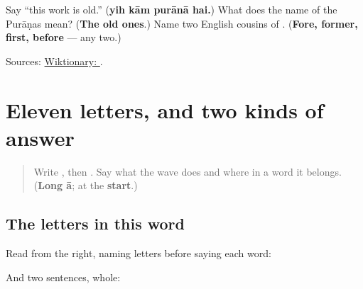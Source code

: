 \begin{tcolorbox}[breakable,colback=teal!4,colframe=teal!35!black,title={Before you move on}]
Say \textquotedblleft{}this work is old.\textquotedblright{} (\textbf{yih kām purānā hai.}) What does the name of the Purāṇas mean? (\textbf{The old ones}.) Name two English cousins of \textbf{}. (\textbf{Fore, former, first, before} — any two.)

Sources: \href{https://en.wiktionary.org/wiki/\%D9\%BE\%D8\%B1\%D8\%A7\%D9\%86\%D8\%A7}{Wiktionary: }.
\end{tcolorbox}
\section[\texorpdfstring{\ur{آم} \ur{آسمان} \ur{آنا} (ām, āsmān, ānā)}{آم آسمان آنا (ām, āsmān, ānā)}]{Eleven letters, and two kinds of answer}

\label{lesson:UR-C18-review-madda}



\begin{quote}
Write , then . Say what the wave does and where in a word it belongs. (\textbf{Long ā}; at the \textbf{start}.)
\end{quote}

\subsection*{The letters in this word}
Read from the right, naming letters before saying each word:

\begin{quote}
\end{quote}

\begin{quote}
\end{quote}

\begin{quote}
\end{quote}

\begin{quote}
\end{quote}

\begin{quote}
\end{quote}

And two sentences, whole:

\begin{quote}
  
\end{quote}

